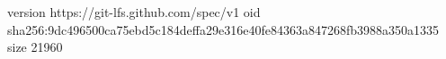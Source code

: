 version https://git-lfs.github.com/spec/v1
oid sha256:9dc496500ca75ebd5c184deffa29e316e40fe84363a847268fb3988a350a1335
size 21960
